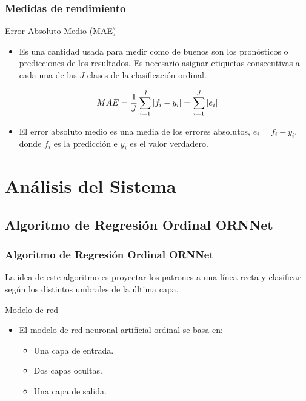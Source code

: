 \documentclass[compress,allowframebreaks]{beamer}
\begin{document}
			\begin{frame}
				\frametitle{\normalsize Medidas de rendimiento}
				
				\begin{block}{Error Absoluto Medio (MAE)}
					\begin{itemize}\justifying
						\item Es una cantidad usada para medir como de buenos son los pronósticos o predicciones de los resultados. Es necesario asignar etiquetas consecutivas a cada una de las $J$ clases de la clasificación ordinal.
					\end{itemize}
					
					\begin{equation}
						\centering
						MAE = \frac{1}{J} \sum_{i=1}^J{\left |{f_i-y_i}\right |} = \sum_{i=1}^J{\left |{e_i}\right |} \nonumber
					\end{equation}
					
					\begin{itemize}\justifying
						\item El error absoluto medio es una media de los errores absolutos, $ e_i = f_i-y_i $, donde $ f_i $ es la predicción e $ y_i $ es el valor verdadero.
					\end{itemize}
				\end{block}
			\end{frame}

	\section{Análisis del Sistema}
	
		\subsection{Algoritmo de Regresión Ordinal ORNNet}
		
			\begin{frame}\justifying
				\frametitle{\normalsize Algoritmo de Regresión Ordinal ORNNet}

				La idea de este algoritmo es proyectar los patrones a una línea recta y clasificar según los distintos umbrales de la última capa.\\

				\begin{block}{Modelo de red}
					\begin{itemize}\justifying
						\item El modelo de red neuronal artificial ordinal se basa en:
						\begin{itemize}\justifying
							\item Una capa de entrada.
							\item Dos capas ocultas.
							\item Una capa de salida.
						\end{itemize}
					\end{itemize}
				\end{block}
			\end{frame}
				
\end{document}

